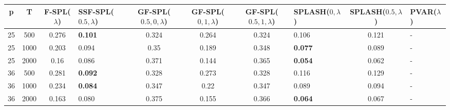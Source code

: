 \begin{tabular}{ccclccclcl}
\hline
  p  &  T   &  F-SPL($\lambda$)  & SSF-SPL($0.5, \lambda$)   &  GF-SPL($0.5, 0, \lambda$)  &  GF-SPL($0, 1, \lambda$)  &  GF-SPL($0.5, 1, \lambda$)  & SPLASH($0, \lambda$)   &  SPLASH($0.5, \lambda$)  & PVAR($\lambda$)   \\
\hline
 25  & 500  &       0.276        & \textbf{0.101}            &            0.324            &           0.264           &            0.324            & 0.106                  &          0.121           & -                 \\
 25  & 1000 &       0.203        & 0.094                     &            0.35             &           0.189           &            0.348            & \textbf{0.077}         &          0.089           & -                 \\
 25  & 2000 &        0.16        & 0.086                     &            0.371            &           0.144           &            0.365            & \textbf{0.054}         &          0.062           & -                 \\
 36  & 500  &       0.281        & \textbf{0.092}            &            0.328            &           0.273           &            0.328            & 0.116                  &          0.129           & -                 \\
 36  & 1000 &       0.234        & \textbf{0.084}            &            0.347            &           0.22            &            0.347            & 0.089                  &          0.094           & -                 \\
 36  & 2000 &       0.163        & 0.080                     &            0.375            &           0.155           &            0.366            & \textbf{0.064}         &          0.067           & -                 \\
\hline
\end{tabular}